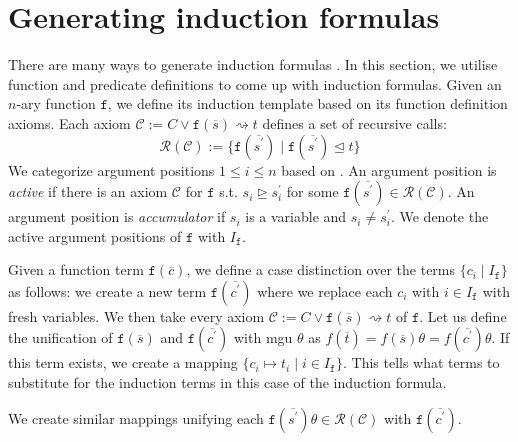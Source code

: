 
\section{Generating induction formulas}

There are many ways to generate induction formulas \cite{aclhandbook,bundychapter,cruanes,hipspec,hipster,isaplanner,computing}. In this section, we utilise function and predicate definitions to come up with induction formulas. Given an $n$-ary function $\mathtt{f}$, we define its induction template based on its function definition axioms. Each axiom $\mathcal{C}:=C\lor \mathtt{f}(\overline{s}) \rightsquigarrow t$ defines a set of recursive calls:
$$\mathcal{R}(\mathcal{C}):=\{\mathtt{f}(\overline{s^\prime})\mid \mathtt{f}(\overline{s^\prime})\trianglelefteq t\}$$
We categorize argument positions $1\le i\le n$ based on \cite{cruanes}. An argument position is \textit{active} if there is an axiom $\mathcal{C}$ for $\mathtt{f}$ s.t. $s_i \trianglerighteq s^\prime_i$ for some $\mathtt{f}(\overline{s^\prime})\in\mathcal{R}(\mathcal{C})$. An argument position is \textit{accumulator} if $s_i$ is a variable and $s_i\neq s^\prime_i$. We denote the active argument positions of $\mathtt{f}$ with $I_\mathtt{f}$.


Given a function term $\mathtt{f}(\overline{c})$, we define a case distinction over the terms $\{c_i\mid I_\mathtt{f}\}$ as follows: we create a new term $\mathtt{f}(\overline{c^\prime})$ where we replace each $c_i$ with $i\in I_\mathtt{f}$ with fresh variables. We then take every axiom $\mathcal{C}:=C\lor \mathtt{f}(\overline{s}) \rightsquigarrow t$ of $\mathtt{f}$. Let us define the unification of $\mathtt{f}(\overline{s})$ and $\mathtt{f}(\overline{c^\prime})$ with mgu $\theta$ as $f(\overline{t})=f(\overline{s})\theta=f(\overline{c^\prime})\theta$. If this term exists, we create a mapping $\{c_i\mapsto t_i\mid i\in I_\mathtt{f}\}$. This tells what terms to substitute for the induction terms in this case of the induction formula.

We create similar mappings unifying each $\mathtt{f}(\overline{s^\prime})\theta\in\mathcal{R}(\mathcal{C})$ with $\mathtt{f}(\overline{c^\prime})$.

